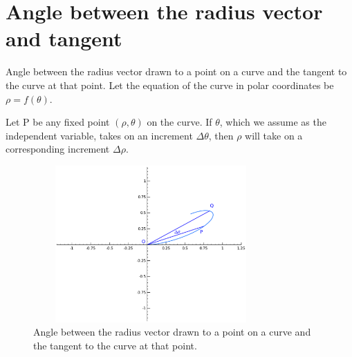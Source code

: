 \section{Angle between the radius vector and tangent}
\label{sec:67}

Angle between the radius vector drawn to a point on a curve 
and the tangent to the curve at that point. Let the equation of the 
curve in polar coordinates be $\rho = f(\theta)$.

Let P be any fixed point $(\rho,\theta)$ on the curve. If $\theta$, which we assume 
as the independent variable, takes on an increment $\Delta \theta$, then $\rho$ 
will take on a corresponding increment $\Delta \rho$. 

\begin{figure}[h!]
\begin{minipage}{\textwidth}
\begin{center}
\includegraphics[height=6cm,width=9cm]{polar-tangent.eps}
\end{center}
\end{minipage}
\caption{Angle between the radius vector drawn to a point on a curve and the tangent to the curve at that point.}
\label{fig:vector-angle}
\end{figure}


